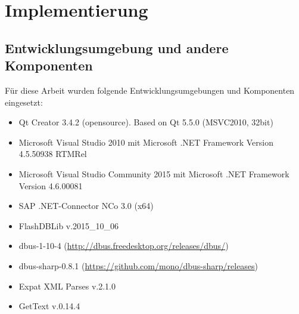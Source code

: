 \chapter{Implementierung} 
\section{Entwicklungsumgebung und andere Komponenten}
Für diese Arbeit wurden folgende Entwicklungsumgebungen und Komponenten eingesetzt:
\begin{itemize}
	\setlength{\itemsep}{-10pt}
	\item Qt Creator 3.4.2 (opensource). Based on Qt 5.5.0 (MSVC2010, 32bit)
	\item Microsoft Visual Studio 2010 mit Microsoft .NET Framework Version 4.5.50938 RTMRel
	\item Microsoft Visual Studio Community 2015 mit Microsoft .NET Framework Version 4.6.00081
	\item SAP .NET-Connector NCo 3.0 (x64)
	\item FlashDBLib v.2015\_10\_06
	\item dbus-1-10-4 (\url{http://dbus.freedesktop.org/releases/dbus/})
	\item dbus-sharp-0.8.1 (\url{https://github.com/mono/dbus-sharp/releases})
	\item Expat XML Parses v.2.1.0 
	\item GetText v.0.14.4
\end{itemize} 


